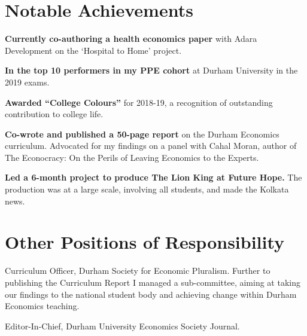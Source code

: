 \documentclass[letterpaper]{article}
\renewenvironment{itemize}{
  \begin{list}{}{
    \setlength{\leftmargin}{1.5em}
  }
}{
  \end{list}
}
\begin{document}
\section*{Notable Achievements}
\begin{itemize}
	\item \textbf{Currently co-authoring a health economics paper} with Adara Development on the `Hospital to Home' project.
	\item \textbf{In the top 10 performers in my PPE cohort} at Durham University in the 2019 exams.
\item \textbf{Awarded “College Colours”} for 2018-19, a recognition of outstanding contribution to college life.
\item \textbf{Co-wrote and published a 50-page report} on the Durham Economics curriculum. Advocated for my findings on a panel with Cahal Moran, author of The Econocracy: On the Perils of Leaving Economics to the Experts.
\item \textbf{Led a 6-month project to produce The Lion King at Future Hope.} The production was at a large scale, involving all students, and made the Kolkata news.
\end{itemize}

\section*{Other Positions of Responsibility}
\begin{itemize}
	\item Curriculum Officer, Durham Society for Economic Pluralism. Further to publishing the Curriculum Report I managed a sub-committee, aiming at taking our findings to the national student body and achieving change within Durham Economics teaching.
\item Editor-In-Chief, Durham University Economics Society Journal.

\end{itemize}


\end{document}
